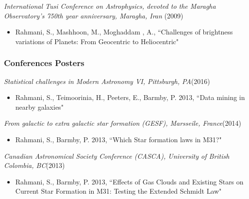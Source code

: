 \documentclass[12pt,twoside]{report}
\numberwithin{figure}{chapter}
\begin{document}
{\sl International Tusi Conference on Astrophysics, devoted to the Maragha Observatory's 750th year
anniversary, Maragha, Iran} \hfill(2009)
\begin{itemize} 
\item Rahmani, S., Mashhoon, M., Moghaddam , A., ``Challenges of brightness variations of Planets: From Geocentric to Heliocentric" 
\end{itemize}
\subsubsection*{Conferences Posters}
{\sl Statistical challenges in Modern Astronomy {\textsc VI}, Pittsburgh, PA}\hfill(2016)
\begin{itemize} 
\item Rahmani, S., Teimoorinia, H., Peeters, E.,  Barmby, P. 2013, ``Data mining in nearby galaxies" 
\end{itemize}

{\sl From galactic to extra galactic star formation (GESF), Marsseile, France}\hfill (2014)
\begin{itemize} 
\item Rahmani, S., Barmby, P. 2013, ``Which Star formation laws in M31?" 
\end{itemize}

{\sl Canadian Astronomical Society Conference (CASCA), University of British Colombia, BC}\hfill (2013)
\begin{itemize} 
\item Rahmani, S., Barmby, P. 2013, ``Effects of Gas Clouds and Existing Stars on Current Star Formation in M31: Testing the Extended Schmidt Law" 
\end{itemize}
\end{document}
